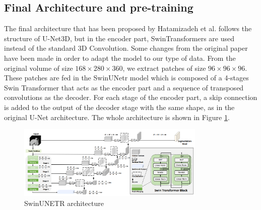 \subsection{Final Architecture and pre-training}
The final architecture that has been proposed by Hatamizadeh et al. \cite{hatamizadeh2022swin} follows the
structure of U-Net3D, but in the encoder part, SwinTransformers are used instead
of the standard 3D Convolution. Some changes from the original paper have been
made in order to adapt the model to our type of data. From the original volume
of size $168 \times 280 \times 360$, we extract patches of size $96 \times 96
\times 96$. These patches are fed in the SwinUNetr model which is composed of a
4-stages Swin Transformer that acts as the encoder part and a sequence of
transposed convolutions as the decoder. For each stage of the encoder part, a
skip connection is added to the output of the decoder stage with the same shape,
as in the original U-Net architecture. The whole architecture is shown in Figure
\ref{fig:swinunetr}.

\begin{figure}[ht!]
  \centering
  \includegraphics[width=0.8\textwidth]{Images/SwinUNETR.png}
  \caption{SwinUNETR architecture}
  \label{fig:swinunetr}
\end{figure}

